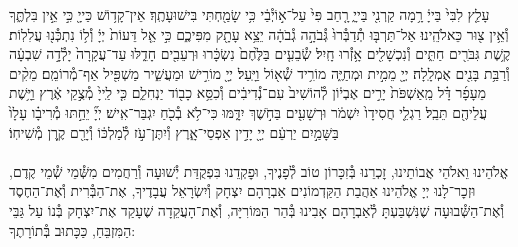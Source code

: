 \documentclass[twoside, openany, parskip=half, 11pt]{book}
\begin{document}
 
עָלַ֤ץ לִבִּי֙ בַּייָ֔ רָ֥מָה קַרְנִ֖י בַּייָ֑ רָ֤חַב פִּי֙ עַל־א֣וֹיְ֯בַ֔י כִּ֥י שָׂמַ֖חְתִּי בִּישׁוּעָתֶֽךָ׃ אֵין־קָד֥וֹשׁ כַּייָ֖ כִּ֣י אֵ֣ין בִּלְתֶּ֑ךָ וְ֯אֵ֥ין צ֖וּר כֵּאלֹהֵֽינוּ׃ אַל־תַּרְבּ֤וּ תְ֯דַבְּ֯רוּ֙ גְּ֯בֹהָ֣ה גְ֯בֹהָ֔ה יֵצֵ֥א עָתָ֖ק מִפִּיכֶ֑ם כִּ֣י אֵ֤ל דֵּעוֹת֙ יְיָ֔ וְ֯ל֥וֹ נִתְכְּ֯נ֖וּ עֲלִלֽוֹת׃ קֶ֥שֶׁת גִּבֹּרִ֖ים חַתִּ֑ים וְ֯נִכְשָׁלִ֖ים אָ֥זְ֯רוּ חָֽיִל׃ שְׂ֯בֵעִ֤ים בַּלֶּ֙חֶם֙ נִשְׂכָּ֔רוּ וּרְעֵבִ֖ים חָדֵ֑לּוּ עַד־עֲקָרָה֙ יָלְ֯דָ֣ה שִׁבְעָ֔ה וְ֯רַבַּ֥ת בָּנִ֖ים אֻמְלָֽלָה׃ יְיָ֖ מֵמִ֣ית וּמְחַיֶּ֑ה מוֹרִ֥יד שְׁ֯א֖וֹל וַיָּֽעַל׃ יְיָ֖ מוֹרִ֣ישׁ וּמַעֲשִׁ֑יר מַשְׁפִּ֖יל אַף־מְ֯רוֹמֵֽם׃ מֵקִ֨ים מֵעָפָ֜ר דָּ֗ל מֵֽאַשְׁפֹּת֙ יָרִ֣ים אֶבְי֔וֹן לְ֯הוֹשִׁיב֙ עִם־נְ֯דִיבִ֔ים וְ֯כִסֵּ֥א כָב֖וֹד יַנְחִלֵ֑ם כִּ֤י לַֽייָ֙ מְ֯צֻ֣קֵי אֶ֔רֶץ וַיָּ֥שֶׁת עֲלֵיהֶ֖ם תֵּבֵֽל׃ רַגְלֵ֤י חֲסִידָו֙ יִשְׁמֹ֔ר וּרְשָׁעִ֖ים בַּחֹ֣שֶׁךְ יִדָּ֑מּוּ כִּי־לֹ֥א בְ֯כֹ֖חַ יִגְבַּר־אִֽישׁ׃ יְיָ֞ יֵחַ֣תּוּ מְ֯רִיבָ֗ו עָלָו֙ בַּשָּׁמַ֣יִם יַרְעֵ֔ם יְיָ֖ יָדִ֣ין אַפְסֵי־אָ֑רֶץ וְ֯יִתֶּן־עֹ֣ז לְ֯מַלְכּ֔וֹ וְ֯יָרֵ֖ם קֶ֥רֶן מְ֯שִׁיחֽוֹ׃\\
\\
אֱלֹהֵינוּ וֵאלֹהֵי אֲבוֹתֵינוּ, זׇכְרֵנוּ בְּ֯זִכָּרוֹן טוֹב לְ֯פָנֶיךָ, וּפׇקְדֵנוּ בִּפְקֻדַּת יְ֯שׁוּעָה וְ֯רַחֲמִים מִשְּׁ֯מֵי שְׁ֯מֵי קֶדֶם, וּזְכׇר־לָנוּ יְיָ אֱלֹהֵינוּ אַהֲבַת הַקַּדְמוֹנִים אַבְרָהָם יִצְחָק וְ֯יִשְׂרָאֵל עֲבָדֶיךָ, אֶת־הַבְּ֯רִית וְ֯אֶת־הַחֶסֶד וְ֯אֶת־הַשְּׁ֯בוּעָה שֶׁנִּשְׁבַּעְתָּ לְ֯אַבְרָהָם אָבִינוּ בְּ֯הַר הַמּוֹרִיָּה, וְ֯אֶת־הָעֲקֵדָה שֶׁעָקַד אֶת־יִצְחָק בְּ֯נוֹ עַל גַּבֵּי הַמִּזְבֵּחַ, כַּכָּתוּב בְּ֯תוֹרָתֶךָ:\\
\end{document}
